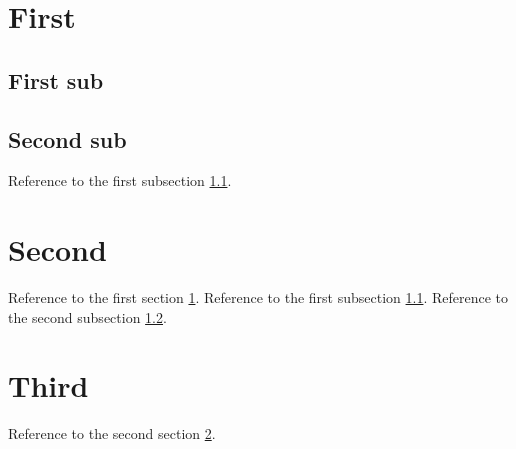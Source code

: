 \documentclass[letterpaper]{article}
\begin{document}
\section{First}
\label{sec:first}
\subsection{First sub}
\label{sec:first_sub_first}
\subsection{Second sub}
\label{sec:first_sub_second}
Reference to the first subsection \cref{sec:first_sub_first}.

\section{Second}
\label{sec:second}
Reference to the first section \cref{sec:first}. 
Reference to the first subsection \cref{sec:first_sub_first}. 
Reference to the second subsection \cref{sec:first_sub_second}.

\section{Third}
\label{sec:third}
Reference to the second section \cref{sec:second}.
\end{document}
